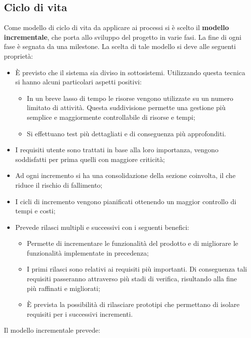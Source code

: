 \subsection{Ciclo di vita}
Come modello di ciclo di vita da applicare ai processi si è scelto il \textbf{modello incrementale}, che porta allo sviluppo del progetto in varie fasi. La fine di ogni fase è segnata da una milestone.
La scelta di tale modello si deve alle seguenti proprietà:
\begin{itemize}
	\item È previsto che il sistema sia diviso in sottosistemi. Utilizzando questa tecnica si hanno alcuni particolari aspetti positivi:
	\begin{itemize}
		\item In un breve lasso di tempo le risorse vengono utilizzate su un numero limitato di attività. Questa suddivisione permette una gestione più semplice e maggiormente controllabile di risorse e tempi;
		\item Si effettuano test più dettagliati e di conseguenza più approfonditi.
	\end{itemize}
	\item I requisiti utente sono trattati in base alla loro importanza, vengono soddisfatti per prima quelli con maggiore criticità;
	\item Ad ogni incremento si ha una consolidazione della sezione coinvolta, il che riduce il rischio di fallimento;
	\item I cicli di incremento vengono pianificati ottenendo un maggior controllo di tempi e costi;
	\item Prevede rilasci multipli e successivi con i seguenti benefici:
	\begin{itemize}
		\item Permette di incrementare le funzionalità del prodotto e di migliorare le funzionalità implementate in precedenza;
		\item I primi rilasci sono relativi ai requisiti più importanti. Di conseguenza tali requisiti passeranno attraverso più stadi di verifica, risultando alla fine più raffinati e migliorati;
		\item È prevista la possibilità di rilasciare prototipi che permettano di isolare requisiti per i successivi incrementi.
	\end{itemize}
\end{itemize}
Il modello incrementale prevede:
